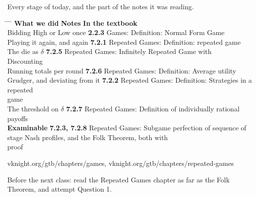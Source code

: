 \newpage
\nonotes
{}

\vspace{0.3cm}

{\large Every stage of today, and the part of the notes it was reading.}

\vspace{0.35cm}

\hspace{0.3cm}
\begin{minipage}{0.95\linewidth}
\begin{tabbing}
\hspace{6.9cm} \= \hspace{3.0cm} \= \hspace{9.4cm} \= \kill
\textbf{What we did} \> {\color{inkteal}\textbf{Notes}} \> \textbf{In the textbook} \>
  \\[0.5em]
Bidding High or Low once \> {\color{inkteal}\textbf{2.2.3}} \> Games: Definition:
  Normal Form Game \> \\[0.35em]
Playing it again, and again \> {\color{inkteal}\textbf{7.2.1}} \> Repeated Games:
  Definition: repeated game \> \\[0.35em]
The die as \(\delta\) \> {\color{inkteal}\textbf{7.2.5}} \> Repeated Games: Infinitely
  Repeated Game with \> \\
\> \> Discounting \> \\[0.35em]
Running totals per round \> {\color{inkteal}\textbf{7.2.6}} \> Repeated Games:
  Definition: Average utility \> \\[0.35em]
Grudger, and deviating from it \> {\color{inkteal}\textbf{7.2.2}} \> Repeated Games:
  Definition: Strategies in a repeated \> \\
\> \> game \> \\[0.35em]
The threshold on \(\delta\) \> {\color{inkteal}\textbf{7.2.7}} \> Repeated Games:
  Definition of individually rational \> \\
\> \> payoffs \> \\[0.35em]
\textbf{Examinable} \> {\color{inkteal}\textbf{7.2.3, 7.2.8}} \> Repeated Games:
  Subgame perfection of sequence of \> \\
\> \> stage Nash profiles, and the Folk Theorem, both with \> \\
\> \> proof \> 
\end{tabbing}
\end{minipage}

\vspace{0.3cm}

{\color{inkgrey} vknight.org/gtb/chapters/games,
\; vknight.org/gtb/chapters/repeated-games}

\vspace{0.2cm}

{\large Before the next class: read the Repeated Games chapter as far as the
Folk Theorem, and attempt Question 1.}


